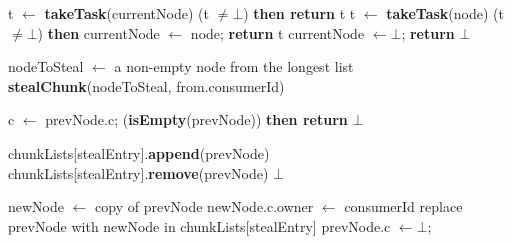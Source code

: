 \begin{algo}[!ht]
\begin{minipage}[t]{0.48\textwidth}
\begin{distribalgo}[1]
\setcounter{alg:non-fifo:lines}{\value{ALC@line}} %
\end{distribalgo}
\end{minipage}%
%
\hfill
%
\begin{minipage}[t]{0.48\textwidth}
%
\begin{distribalgo}[1]
\setcounter{ALC@line}{\value{alg:non-fifo:lines}}
\smallskip

		\STATE t $\leftarrow$ {\bf takeTask}(currentNode)
		 (t $\neq \bot$) {\bf then return} t
	\ENDINDENT
  		\STATE t $\leftarrow$ {\bf takeTask}(node)
			 (t $\neq \bot$) {\bf then} currentNode $\leftarrow$ node; {\bf return} t
  	\ENDINDENT
	\ENDINDENT
	\STATE currentNode $\leftarrow \bot$; {\bf return} $\bot$
\ENDINDENT

\medskip

	\STATE nodeToSteal $\leftarrow$ a non-empty node from the longest list
	 {\bf stealChunk}(nodeToSteal, from.consumerId)
%		
%	
\ENDINDENT

\medskip

  \STATE c $\leftarrow$ prevNode.c;
   ({\bf isEmpty}(prevNode)) {\bf then return} $\bot$

  \STATE chunkLists[stealEntry].{\bf append}(prevNode)
 		\STATE chunkLists[stealEntry].{\bf remove}(prevNode)
 		 $\bot$ 
	\ENDINDENT
	
	\smallskip
	\STATE newNode $\leftarrow$ copy of prevNode
	\STATE newNode.c.owner $\leftarrow$ consumerId
	\STATE replace prevNode with newNode in chunkLists[stealEntry]
	\STATE prevNode.c $\leftarrow \bot$; 
	

\end{distribalgo}
\end{minipage}
\end{algo}
